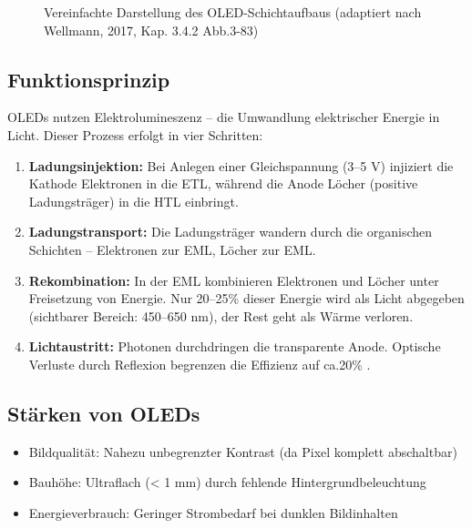 \begin{figure}[htbp]
    \centering
    \resizebox{0.8\linewidth}{!}{%
        
    }
    \caption{Vereinfachte Darstellung des OLED-Schichtaufbaus (adaptiert nach Wellmann, 2017, Kap. 3.4.2 Abb.3-83) \cite{Wellmann:2017}}
    \label{fig:OLEDAufbau}
\end{figure}

\subsection{Funktionsprinzip}
OLEDs nutzen Elektrolumineszenz – die Umwandlung elektrischer Energie in Licht. Dieser Prozess erfolgt in vier Schritten:
\begin{enumerate}
    \item \textbf{Ladungsinjektion:}
    Bei Anlegen einer Gleichspannung (3–5 V) injiziert die Kathode Elektronen in die ETL, während die Anode Löcher (positive Ladungsträger) in die HTL einbringt.
    
    \item \textbf{Ladungstransport:}  
    Die Ladungsträger wandern durch die organischen Schichten – Elektronen zur EML, Löcher zur EML.  
    
    \item \textbf{Rekombination:}  
    In der EML kombinieren Elektronen und Löcher unter Freisetzung von Energie. Nur 20–25\% dieser Energie wird als Licht abgegeben (sichtbarer Bereich: 450–650 nm), der Rest geht als Wärme verloren.  
    
    \item \textbf{Lichtaustritt:}  
    Photonen durchdringen die transparente Anode. Optische Verluste durch Reflexion begrenzen die Effizienz auf ca.20\%  \cite{Wellmann:2017}.  
\end{enumerate}

\subsection{Stärken von OLEDs}
\begin{itemize}
    \item Bildqualität:
    Nahezu unbegrenzter Kontrast (da Pixel komplett abschaltbar)
    \item Bauhöhe:
    Ultraflach (< 1 mm) durch fehlende Hintergrundbeleuchtung
    \item Energieverbrauch:
    Geringer Strombedarf bei dunklen Bildinhalten
\end{itemize}
\cite{Bartlett:2023} \cite{Stotz:2019} \cite{Wellmann:2017}

